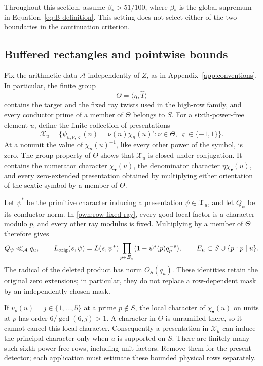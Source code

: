 \documentclass[12pt]{article}
\begin{document}
Throughout this section, assume \(\beta_*>51/100\), where \(\beta_*\)
is the global supremum in Equation~\eqref{eq:B-definition}.  This setting
does not select either of the two boundaries in the continuation
criterion.

\subsection{Buffered rectangles and pointwise bounds}

Fix the arithmetic data \(\mathcal A\) independently of \(Z\), as in
Appendix~\ref{app:conventions}.  In particular, the finite group
\[
 \Theta=\langle\eta,\widehat T\rangle
\]
contains the target and the fixed ray twists used in the high-row
family, and every conductor prime of a member of \(\Theta\) belongs
to \(S\).  For a
sixth-power-free element \(u\), define the finite collection of
presentations
\[
 \mathcal X_u=
 \bigl\{\psi_{u,\nu,\varsigma}(n)=\nu(n)\chi_n(u)^\varsigma:
       \nu\in\Theta,\ \varsigma\in\{-1,1\}\bigr\}.
\]
At a nonunit the value of \(\chi_n(u)^{-1}\), like every other
power of the symbol, is zero.  The group property of \(\Theta\)
shows that \(\mathcal X_u\) is closed under conjugation.  It contains
the numerator character \(\chi_\bullet(u)\), the denominator
character \(\eta\overline{\chi_\bullet(u)}\), and every zero-extended
presentation obtained by multiplying either orientation of the sextic
symbol by a member of \(\Theta\).

Let \(\psi^*\) be the primitive character inducing a presentation
\(\psi\in\mathcal X_u\), and let \(Q_\psi\) be its conductor norm.
In \eqref{own:row-fixed-ray}, every good local factor is a
character modulo \(p\), and every other ray modulus is fixed.
Multiplying by a member of \(\Theta\) therefore gives
\[
 Q_\psi\ll_{\mathcal A}q_u,\qquad
 L_{\rm orig}(s,\psi)
   =L(s,\psi^*)\prod_{p\in E_u}(1-\psi^*(p)q_p^{-s}),
 \qquad
 E_u\subset S\cup\{p:p\mid u\}.
\]
The radical of the deleted product has norm \(O_S(q_u)\).
These identities retain the original zero extensions; in particular,
they do not replace a row-dependent mask by an independently chosen
mask.

\label{par:physical-row-ramification}
If \(v_p(u)=j\in\{1,\ldots,5\}\) at a prime \(p\notin S\), the
local character of \(\chi_\bullet(u)\) on units at \(p\) has order
\(6/\gcd(6,j)>1\).  A character in \(\Theta\) is unramified there,
so it cannot cancel this local character.  Consequently a
presentation in \(\mathcal X_u\) can induce the principal character
only when \(u\) is supported on \(S\).  There are finitely many such
sixth-power-free rows, including unit factors.  Remove them for the
present detector; each application must estimate these bounded physical
rows separately.
\end{document}

